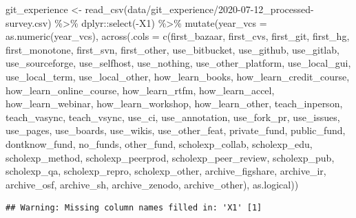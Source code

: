 \documentclass[
]{krantz}
\makeatletter
\newenvironment{Shaded}{\begin{snugshade}}{\end{snugshade}}
\newcommand{\AttributeTok}[1]{\textcolor[rgb]{0.61,0.61,0.61}{#1}}
\newcommand{\FunctionTok}[1]{\textcolor[rgb]{0,0,0}{#1}}
\newcommand{\NormalTok}[1]{#1}
\newcommand{\OtherTok}[1]{\textcolor[rgb]{0.37,0.37,0.37}{#1}}
\newcommand{\SpecialCharTok}[1]{\textcolor[rgb]{0,0,0}{#1}}
\newcommand{\StringTok}[1]{\textcolor[rgb]{0.5,0.5,0.5}{#1}}
\newenvironment{kframe}{%
\medskip{}
\setlength{\fboxsep}{.8em}
 \def\at@end@of@kframe{}%
 \ifinner\ifhmode%
  \def\at@end@of@kframe{\end{minipage}}%
  \begin{minipage}{\columnwidth}%
 \fi\fi%
 \def\FrameCommand##1{\hskip\@totalleftmargin \hskip-\fboxsep
 \colorbox{shadecolor}{##1}\hskip-\fboxsep
     \hskip-\linewidth \hskip-\@totalleftmargin \hskip\columnwidth}%
 \MakeFramed {\advance\hsize-\width
   \@totalleftmargin\z@ \linewidth\hsize
   \@setminipage}}%
 {\par\unskip\endMakeFramed%
 \at@end@of@kframe}
\renewenvironment{Shaded}{\begin{kframe}}{\end{kframe}}
\makeatother
\begin{document}
\begin{Shaded}
\begin{Highlighting}[]
\NormalTok{git\_experience }\OtherTok{\textless{}{-}} \FunctionTok{read\_csv}\NormalTok{(}\StringTok{\textquotesingle{}data/git\_experience/2020{-}07{-}12\_processed{-}survey.csv\textquotesingle{}}\NormalTok{) }\SpecialCharTok{\%\textgreater{}\%}
\NormalTok{  dplyr}\SpecialCharTok{::}\FunctionTok{select}\NormalTok{(}\SpecialCharTok{{-}}\NormalTok{X1) }\SpecialCharTok{\%\textgreater{}\%}
  \FunctionTok{mutate}\NormalTok{(}\AttributeTok{year\_vcs =} \FunctionTok{as.numeric}\NormalTok{(year\_vcs),}
         \FunctionTok{across}\NormalTok{(}\AttributeTok{.cols =} \FunctionTok{c}\NormalTok{(first\_bazaar, first\_cvs, first\_git, first\_hg, }
\NormalTok{                          first\_monotone, first\_svn, first\_other, use\_bitbucket, }
\NormalTok{                          use\_github, use\_gitlab, use\_sourceforge, use\_selfhost, }
\NormalTok{                          use\_nothing, use\_other\_platform, use\_local\_gui,}
\NormalTok{                          use\_local\_term, use\_local\_other, how\_learn\_books, }
\NormalTok{                          how\_learn\_credit\_course, how\_learn\_online\_course, }
\NormalTok{                          how\_learn\_rtfm, how\_learn\_accel, how\_learn\_webinar, }
\NormalTok{                          how\_learn\_workshop, how\_learn\_other, teach\_inperson,}
\NormalTok{                          teach\_vasync, teach\_vsync, use\_ci, use\_annotation, }
\NormalTok{                          use\_fork\_pr, use\_issues, use\_pages, use\_boards, }
\NormalTok{                          use\_wikis, use\_other\_feat, private\_fund, public\_fund,}
\NormalTok{                          dontknow\_fund, no\_funds, other\_fund, scholexp\_collab, }
\NormalTok{                          scholexp\_edu, scholexp\_method, scholexp\_peerprod, }
\NormalTok{                          scholexp\_peer\_review, scholexp\_pub, scholexp\_qa, }
\NormalTok{                          scholexp\_repro, scholexp\_other, archive\_figshare, }
\NormalTok{                          archive\_ir, archive\_osf, archive\_sh, archive\_zenodo, }
\NormalTok{                          archive\_other), }
\NormalTok{                as.logical))}
\end{Highlighting}
\end{Shaded}

\begin{verbatim}
## Warning: Missing column names filled in: 'X1' [1]
\end{verbatim}
\end{document}
